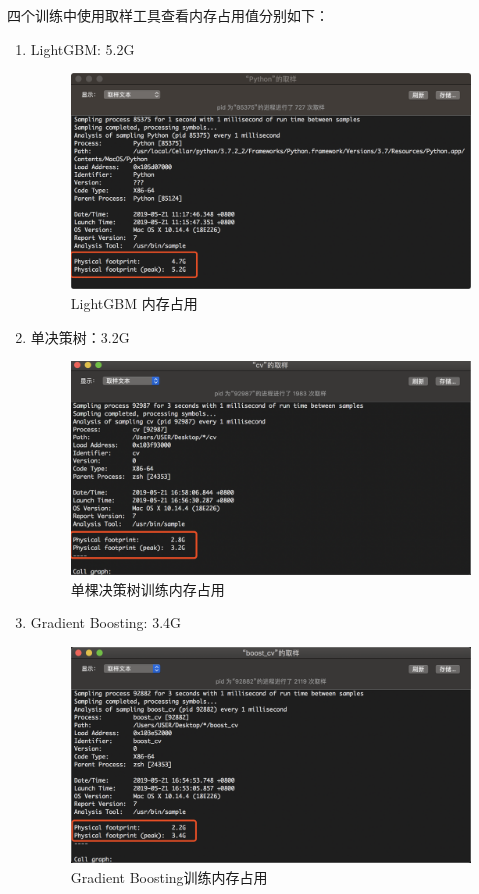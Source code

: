 \documentclass[12pt]{article}
\begin{document}
四个训练中使用取样工具查看内存占用值分别如下：
\begin{enumerate}
    \item LightGBM: 5.2G
    \begin{figure}[H]
        \centering
        \includegraphics[scale=0.46]{lgb-memory.png}
        \caption{LightGBM 内存占用}
        \label{}
    \end{figure}

    \item 单决策树：3.2G
    \begin{figure}[H]
        \centering
        \includegraphics[scale=0.5]{single-tree-memory.png}
        \caption{单棵决策树训练内存占用}
        \label{}
    \end{figure}

    \item Gradient Boosting: 3.4G
    \begin{figure}[H]
        \centering
        \includegraphics[scale=0.44]{gbdt-memory.png}
        \caption{Gradient Boosting训练内存占用}
        \label{}
    \end{figure}


\end{enumerate}
\end{document}
